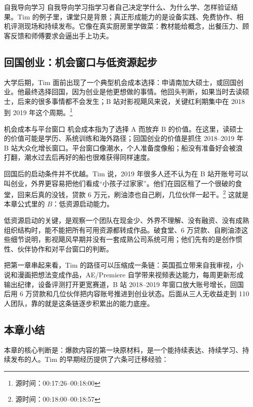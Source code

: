 \begin{knowledgebox}{自我导向学习}
自我导向学习指学习者自己决定学什么、为什么学、怎样验证结果。Tim 的例子里，课堂只是背景；真正形成能力的是设备实践、免费协作、相机评测现场和持续发布。它像在真实厨房里学做菜：教材能给概念，出餐压力、顾客反馈和师傅要求会逼出手上功夫。
\end{knowledgebox}

\subsection{回国创业：机会窗口与低资源起步}

大学后期，Tim 面前出现了一个典型机会成本选择：申请南加大硕士，或回国创业。他最终选择回国，因为创业是他更想做的事情。他回头判断，如果当时去读硕士，后来的很多事情都不会发生；B 站对影视飓风来说，关键红利期集中在 2018 到 2019 年这个周期。\footnote{源时间：00:17:26--00:18:00}

\begin{knowledgebox}{机会成本与平台窗口}
机会成本指为了选择 A 而放弃 B 的价值。在这里，读硕士的价值可能是学历、系统训练和海外路径；回国创业的价值是抓住 2018--2019 年 B 站大众化增长窗口。平台窗口像潮水，个人准备度像船；船没有准备好会被浪打翻，潮水过去后再好的船也很难获得同样速度。
\end{knowledgebox}

回国后的启动条件并不优越。Tim 说，2019 年很多人还不认为在 B 站开账号可以叫创业，外界更容易把他们看成“小孩子过家家”。他们在园区租了一个很破的食堂，回来后真的没钱，贷款 6 万元，刷油漆也自己刷，几位伙伴一起干。\footnote{源时间：00:18:00--00:18:57} 这就是本章公式里的 $B$：低资源启动能力。

低资源启动的关键，是观察一个团队在现金少、外界不理解、没有融资、没有成熟组织结构时，能不能把所有可用资源都转成作品。破食堂、6 万贷款、自刷油漆这些细节说明，影视飓风早期并没有一套成熟公司系统可用；他们先有的是创作惯性、伙伴协作和对平台窗口的判断。

把第一章串起来看，Tim 的路径可以压缩成一条链：英国孤立带来自我审视，小说和漫画把想法变成作品，AE/Premiere 自学带来视频表达能力，每周更新形成输出纪律，设备评测打开更宽赛道，B 站 2018--2019 年窗口放大账号增长，回国后用 6 万贷款和几位伙伴把内容账号推进到创业状态。后面从三人无收益走到 110 人团队，靠的就是这条链逐步积累出的能力底座。

\subsection{本章小结}

本章的核心判断是：爆款内容的第一块原材料，是一个能持续表达、持续学习、持续发布的人。Tim 的早期经历提供了六条可迁移经验：

